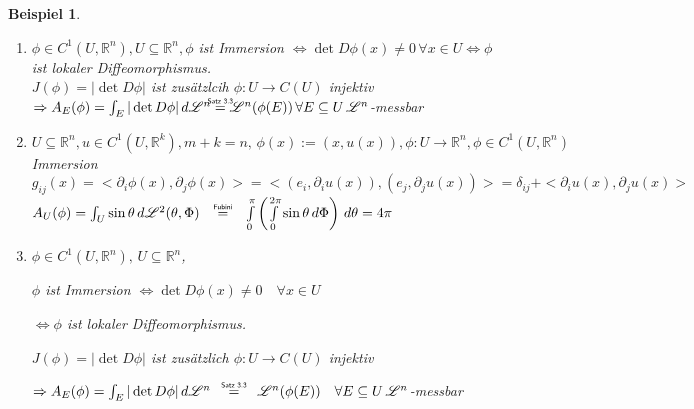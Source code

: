 \documentclass[11pt]{memoir}
\theoremstyle{changebreak}
\newtheorem{Beispiel}{Beispiel}[chapter]
\newcommand\overequal[1]{\mathrel{\overset{\makebox[0pt]{\mbox{\normalfont\tiny\sffamily $ #1 $}}}{=}}}
\begin{document}
\begin{Beispiel}
\begin{enumerate}

	$A_U(\phi) = \int_U \sin\theta\,d\mathscr L^2(\theta, \Phi) \overequal{\text{Fubini}} \int\limits_0^\pi \left( \int\limits_0^{2\pi} \sin\theta \, d\Phi\right) \,d\theta = 4 \pi$

	\item $\phi \in C^1(U, \mathbb R^n), U \subseteq \mathbb R^n, \phi$ ist Immersion $\Leftrightarrow \det D\phi(x) \ne 0 \, \forall x \in U \Leftrightarrow \phi$ ist lokaler Diffeomorphismus. \\
	$J(\phi)= |\det D\phi|$ ist zusätzlcih $\phi: U \rightarrow C(U)$ injektiv \\
	$\Rightarrow A_E (\phi) = \int_E |\det D\phi|\, d\mathscr L^n \overequal{\text{Satz 3.3}} \mathscr L^n(\phi(E)) \, \forall E \subseteq U \, \mathscr L^n$-messbar

	\item $U \subseteq \mathbb R^n, u \in C^1(U, \mathbb R^k), m+k =n,\, \phi(x) := (x, u(x)), \phi: U \rightarrow \mathbb R^n, \phi \in C^1(U, \mathbb R^n)$ Immersion \\
	$g_{ij}(x) = <\partial_i \phi(x), \partial_j \phi(x)> = <(e_i, \partial_i u(x)), (e_j, \partial_j u(x))> =
	\delta_{ij} + <\partial_i u(x), \partial_j u(x)> $ \\


	$A_U(\phi) = \int_U \sin\theta\,d\mathscr L^2(\theta, \Phi) \quad \overequal{\text{Fubini}} \quad \int\limits_0^\pi \left( \int\limits_0^{2\pi} \sin\theta \, d\Phi\right) \,d\theta = 4 \pi$

	\item $\phi \in C^1(U, \mathbb R^n), \, U \subseteq \mathbb R^n$,
	\par
	$\phi$ ist Immersion $\Leftrightarrow \det D\phi(x) \ne 0 \quad \forall x \in U$
	\par
	$\Leftrightarrow \phi$ ist lokaler Diffeomorphismus.
	\par
	$J(\phi)= |\det D\phi|$ ist zusätzlich $\phi: U \rightarrow C(U)$ injektiv
	\par
	$\Rightarrow A_E (\phi) = \int_E |\det D\phi|\, d\mathscr L^n \quad \overequal{\text{Satz 3.3}} \quad \mathscr L^n(\phi(E)) \quad \forall E \subseteq U \, \mathscr L^n$-messbar


\end{enumerate}
\end{Beispiel}
\end{document}
